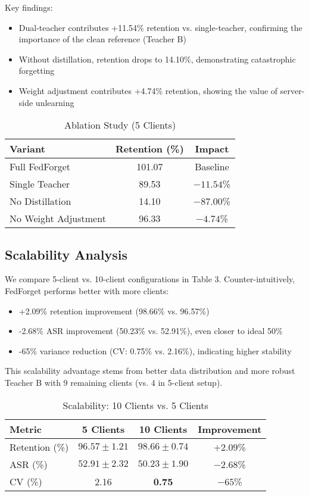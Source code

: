 \documentclass[11pt,a4paper]{article}
\begin{document}
Key findings:
\begin{itemize}
\item Dual-teacher contributes +11.54\% retention vs. single-teacher, confirming the importance of the clean reference (Teacher B)
\item Without distillation, retention drops to 14.10\%, demonstrating catastrophic forgetting
\item Weight adjustment contributes +4.74\% retention, showing the value of server-side unlearning
\end{itemize}

\begin{table}[t]
\centering
\caption{Ablation Study (5 Clients)}
\label{tab:ablation}
\begin{tabular}{lcc}
\toprule
Variant & Retention (\%) & Impact \\
\midrule
Full FedForget & 101.07 & Baseline \\
Single Teacher & 89.53 & $-11.54$\% \\
No Distillation & 14.10 & $-87.00$\% \\
No Weight Adjustment & 96.33 & $-4.74$\% \\
\bottomrule
\end{tabular}
\end{table}

\subsection{Scalability Analysis}

We compare 5-client vs. 10-client configurations in Table 3. Counter-intuitively, FedForget performs better with more clients:

\begin{itemize}
\item +2.09\% retention improvement (98.66\% vs. 96.57\%)
\item -2.68\% ASR improvement (50.23\% vs. 52.91\%), even closer to ideal 50\%
\item -65\% variance reduction (CV: 0.75\% vs. 2.16\%), indicating higher stability
\end{itemize}

This scalability advantage stems from better data distribution and more robust Teacher B with 9 remaining clients (vs. 4 in 5-client setup).

\begin{table}[t]
\centering
\caption{Scalability: 10 Clients vs. 5 Clients}
\label{tab:scalability}
\begin{tabular}{lccc}
\toprule
Metric & 5 Clients & 10 Clients & Improvement \\
\midrule
Retention (\%) & $96.57 \pm 1.21$ & $\mathbf{98.66} \pm \mathbf{0.74}$ & $+2.09$\% \\
ASR (\%) & $52.91 \pm 2.32$ & $\mathbf{50.23} \pm \mathbf{1.90}$ & $-2.68$\% \\
CV (\%) & 2.16 & \textbf{0.75} & $-65$\% \\
\bottomrule
\end{tabular}
\end{table}
\end{document}
